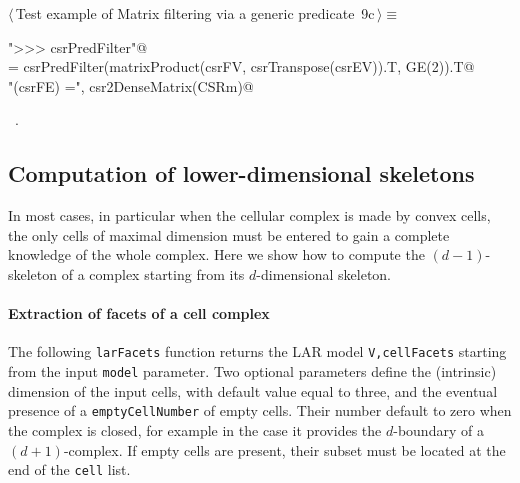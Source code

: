 \documentclass[11pt,oneside]{article}	%
\begin{document}
\begin{flushleft} \small \label{scrap17}
\protect{}$\langle\,$Test example of Matrix filtering via a generic predicate\nobreak\ {\footnotesize 9c}$\,\rangle\equiv$
\vspace{-1ex}
\begin{list}{}{} \item
\mbox{}\verb@print "\n>>> csrPredFilter"@\\
\mbox{}\verb@CSRm = csrPredFilter(matrixProduct(csrFV, csrTranspose(csrEV)).T, GE(2)).T@\\
\mbox{}\verb@print "\nccsrPredFilter(csrFE) =\n", csr2DenseMatrix(CSRm)@\\
\mbox{}\verb@@{\NWsep}
\end{list}
\vspace{-1ex}
\footnotesize\addtolength{\baselineskip}{-1ex}
\begin{list}{}{\setlength{\itemsep}{-\parsep}\setlength{\itemindent}{-\leftmargin}}
\item \NWtxtMacroRefIn\ .
\end{list}
\end{flushleft}


\subsection{Computation of lower-dimensional skeletons}

In most cases, in particular when the cellular complex is made by convex cells, the only cells of maximal dimension must be entered to gain a complete knowledge of the whole complex.
Here we show how to compute the $(d-1)$-skeleton of a complex starting from its $d$-dimensional skeleton.

\paragraph{Extraction of facets of a cell complex} 

The following \texttt{larFacets} function returns the LAR model \texttt{V,cellFacets} starting from the input \texttt{model} parameter. Two optional parameters define the (intrinsic) dimension of the input cells, with default value equal to three, and the eventual presence of a \texttt{emptyCellNumber} of empty cells. Their number default to zero when the complex is closed, for example in the case it provides the $d$-boundary of a $(d+1)$-complex. If empty cells are present, their subset must be located at the end of the \texttt{cell} list.
\end{document}
